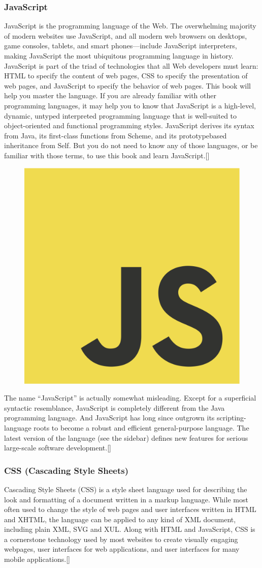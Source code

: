 \subsubsection*{JavaScript}
JavaScript is the programming language of the Web. The overwhelming majority of
modern websites use JavaScript, and all modern web browsers on desktops, game
consoles, tablets, and smart phones—include JavaScript interpreters, making JavaScript
the most ubiquitous programming language in history. JavaScript is part of the
triad of technologies that all Web developers must learn: HTML to specify the content
of web pages, CSS to specify the presentation of web pages, and JavaScript to specify
the behavior of web pages. This book will help you master the language.
If you are already familiar with other programming languages, it may help you to know
that JavaScript is a high-level, dynamic, untyped interpreted programming language
that is well-suited to object-oriented and functional programming styles. JavaScript
derives its syntax from Java, its first-class functions from Scheme, and its prototypebased
inheritance from Self. But you do not need to know any of those languages, or
be familiar with those terms, to use this book and learn JavaScript.[\cite{12}]
\newline
\begin{figure}[h]
	\centering
	\includegraphics[width=0.4\linewidth]{images/js}
	\label{fig:js-logo}
\end{figure}
The name “JavaScript” is actually somewhat misleading. Except for a superficial syntactic
resemblance, JavaScript is completely different from the Java programming language.
And JavaScript has long since outgrown its scripting-language roots to become
a robust and efficient general-purpose language. The latest version of the language (see
the sidebar) defines new features for serious large-scale software development.[\cite{12}]  

\subsubsection*{CSS (Cascading Style Sheets)}
Cascading Style Sheets (CSS) is a style sheet language used for describing the look and formatting of a document written in a markup language. While most often used to change the style of web pages and user interfaces written in HTML and XHTML, the language can be applied to any kind of XML document, including plain XML, SVG and XUL. Along with HTML and JavaScript, CSS is a cornerstone technology used by most websites to create visually engaging webpages, user interfaces for web applications, and user interfaces for many mobile applications.[\cite{7}]
\newline

